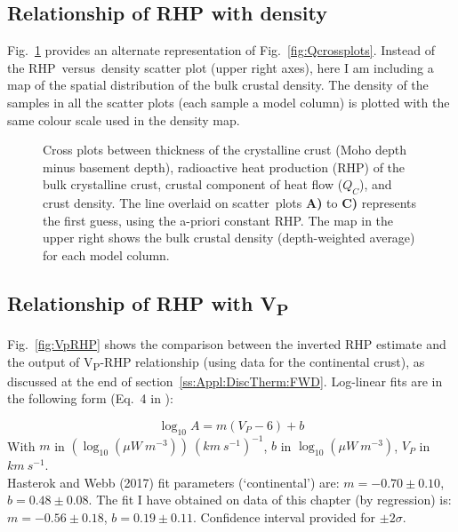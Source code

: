 \begin{subappendices}
\subsection{Relationship of RHP with density}
\label{ss:ApplSup:Rel:Rho}

Fig.~\ref{fig:RhoRHP} provides an alternate representation of Fig.~\ref{fig:Qcrossplots}.
Instead of the RHP~versus~density scatter plot (upper right axes), here I am including a map of the spatial distribution of the bulk crustal density.
The density of the samples in all the scatter plots (each sample a model column) is plotted with the same colour scale used in the density map.

\begin{figure}
	\begin{adjustbox}{center}
	\end{adjustbox}
	\caption[Cross plots: crust thickness, RHP, crustal heat flow, crust density.]{Cross plots between thickness of the crystalline crust (Moho depth minus basement depth), radioactive heat production (RHP) of the bulk crystalline crust, crustal component of heat flow ($Q_C$), and crust density. The line overlaid on scatter~plots \textbf{A)} to \textbf{C)} represents the first guess, using the a-priori constant RHP.
	The map in the upper right shows the bulk crustal density (depth-weighted average) for each model column.}
	\label{fig:RhoRHP}
\end{figure}

\subsection[Relationship of RHP with VP]{Relationship of RHP with V\textsubscript{P}}
\label{ss:ApplSup:Rel:VP}

Fig.~\ref{fig:VpRHP} shows the comparison between the inverted RHP estimate and the output of \parencite{Hasterok2017_ign} V\textsubscript{P}-RHP relationship (using data for the continental crust), as discussed at the end of section~\ref{ss:Appl:DiscTherm:FWD}.
Log-linear fits are in the following form (Eq.~4 in \cite{Hasterok2017_ign}):

\begin{equation*}
	\log_{10} A = m (V_{P} - 6) + b
\end{equation*}
With $m$ in $(\log_{10} (\mu W \ m^{-3})) \ (km \ s^{-1})^{-1}$, $b$ in $\log_{10} (\mu W \ m^{-3})$, $V_{P}$ in $km \ s^{-1}$. \\
Hasterok and Webb (2017) fit parameters (`continental') are: $m = -0.70 \pm 0.10$, $b = 0.48 \pm 0.08$.
The fit I have obtained on data of this chapter (by regression) is: $m = -0.56 \pm 0.18$, $b = 0.19 \pm 0.11$.
Confidence interval provided for $\pm 2 \sigma$.


\end{subappendices}
